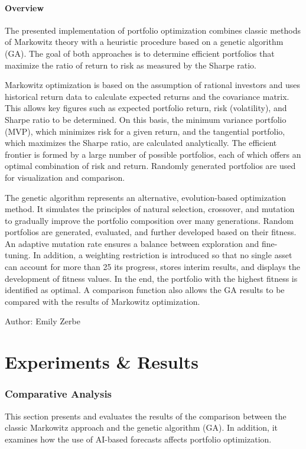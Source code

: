 \documentclass{agasthesis}
\begin{document}
\subsubsection{Overview}
The presented implementation of portfolio optimization combines classic methods of Markowitz theory with a heuristic procedure based on a genetic algorithm (GA). 
The goal of both approaches is to determine efficient portfolios that maximize the ratio of return to risk as measured by the Sharpe ratio.

Markowitz optimization is based on the assumption of rational investors and uses historical return data to calculate expected returns and the covariance matrix. 
This allows key figures such as expected portfolio return, risk (volatility), and Sharpe ratio to be determined. On this basis, the minimum variance portfolio (MVP), 
which minimizes risk for a given return, and the tangential portfolio, which maximizes the Sharpe ratio, are calculated analytically. The efficient frontier is formed by 
a large number of possible portfolios, each of which offers an optimal combination of risk and return. Randomly generated portfolios are used for visualization and comparison.

The genetic algorithm represents an alternative, evolution-based optimization method. It simulates the principles of natural selection, crossover, and mutation to gradually improve 
the portfolio composition over many generations. Random portfolios are generated, evaluated, and further developed based on their fitness. An adaptive mutation rate ensures a balance 
between exploration and fine-tuning. In addition, a weighting restriction is introduced so that no single asset can account for more than 25%
its progress, stores interim results, and displays the development of fitness values. In the end, the portfolio with the highest fitness is identified as optimal. A comparison function 
also allows the GA results to be compared with the results of Markowitz optimization.

Author: Emily Zerbe

\chapter{Experiments & Results}
\subsection{Comparative Analysis}
This section presents and evaluates the results of the comparison between the classic Markowitz approach and the genetic algorithm (GA). 
In addition, it examines how the use of AI-based forecasts affects portfolio optimization. 
\end{document}
